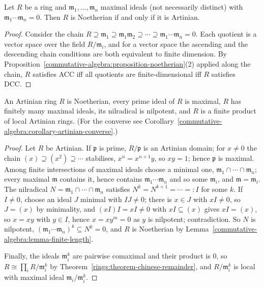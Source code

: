 \begin{lemma}\label{commutative-algebra:lemma-finite-length}
Let $R$ be a ring and $\mathfrak{m}_1, \ldots, \mathfrak{m}_n$ maximal ideals (not necessarily distinct) with
$\mathfrak{m}_1 \cdots \mathfrak{m}_n = 0$. Then $R$ is Noetherian if and only if it is Artinian.
\end{lemma}

\begin{proof}
Consider the chain $R \supseteq \mathfrak{m}_1 \supseteq \mathfrak{m}_1\mathfrak{m}_2 \supseteq \cdots \supseteq \mathfrak{m}_1 \cdots \mathfrak{m}_n = 0$.
Each quotient is a vector space over the field $R/\mathfrak{m}_i$, and for a vector space the ascending and the descending
chain conditions are both equivalent to finite dimension. By Proposition~\ref{commutative-algebra:proposition-noetherian}(2)
applied along the chain, $R$ satisfies ACC iff all quotients are finite-dimensional iff $R$ satisfies DCC.
\end{proof}

\begin{theorem}\label{commutative-algebra:theorem-artinian}
An Artinian ring $R$ is Noetherian, every prime ideal of $R$ is maximal, $R$ has finitely many maximal ideals, its
nilradical is nilpotent, and $R$ is a finite product of local Artinian rings. (For the converse see
Corollary~\ref{commutative-algebra:corollary-artinian-converse}.)
\end{theorem}

\begin{proof}
Let $R$ be Artinian. If $\mathfrak{p}$ is prime, $R/\mathfrak{p}$ is an Artinian domain; for $x \neq 0$ the chain
$(x) \supseteq (x^2) \supseteq \cdots$ stabilises, $x^n = x^{n+1}y$, so $xy = 1$; hence $\mathfrak{p}$ is maximal. Among finite
intersections of maximal ideals choose a minimal one, $\mathfrak{m}_1 \cap \cdots \cap \mathfrak{m}_n$; every maximal $\mathfrak{m}$
contains it, hence contains $\mathfrak{m}_1 \cdots \mathfrak{m}_n$ and so some $\mathfrak{m}_i$, and $\mathfrak{m} = \mathfrak{m}_i$. The nilradical
$N = \mathfrak{m}_1 \cap \cdots \cap \mathfrak{m}_n$ satisfies $N^k = N^{k+1} = \cdots =: I$ for some $k$. If $I \neq 0$, choose an ideal
$J$ minimal with $IJ \neq 0$; there is $x \in J$ with $xI \neq 0$, so $J = (x)$ by minimality, and $(xI)I = xI \neq 0$ with
$xI \subseteq (x)$ gives $xI = (x)$, so $x = xy$ with $y \in I$, hence $x = xy^m = 0$ as $y$ is nilpotent; contradiction. So $N$ is
nilpotent, $(\mathfrak{m}_1 \cdots \mathfrak{m}_n)^k \subseteq N^k = 0$, and $R$ is Noetherian by
Lemma~\ref{commutative-algebra:lemma-finite-length}.

Finally, the ideals $\mathfrak{m}_i^k$ are pairwise comaximal and their product is $0$, so $R \cong \prod_i R/\mathfrak{m}_i^k$ by
Theorem~\ref{rings:theorem-chinese-remainder}, and $R/\mathfrak{m}_i^k$ is local with maximal ideal $\mathfrak{m}_i/\mathfrak{m}_i^k$.
\end{proof}

